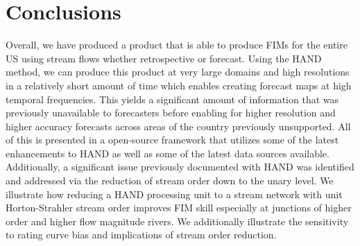 \section{Conclusions}
\label{sec:conclusions}
%
Overall, we have produced a product that is able to produce FIMs for the entire US using stream flows whether retrospective or forecast.
Using the HAND method, we can produce this product at very large domains and high resolutions in a relatively short amount of time which enables creating forecast maps at high temporal frequencies.
This yields a significant amount of information that was previously unavailable to forecasters before enabling for higher resolution and higher accuracy forecasts across areas of the country previously unsupported.
All of this is presented in a open-source framework that utilizes some of the latest enhancements to HAND as well as some of the latest data sources available. 
Additionally, a significant issue previously documented with HAND was identified and addressed via the reduction of stream order down to the unary level.
We illustrate how reducing a HAND processing unit to a stream network with unit Horton-Strahler stream order improves FIM skill especially at junctions of higher order and higher flow magnitude rivers.
We additionally illustrate the sensitivity to rating curve bias and implications of stream order reduction.
%
